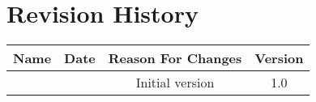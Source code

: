 \chapter{Revision History}

\begin{center}
  \begin{tabular}{|c|c|c|c|}
   \hline
   Name              & Date       & Reason For Changes & Version \\
   \hline
    &  & Initial version    & 1.0     \\
   \hline
   
  \end{tabular}
\end{center}
